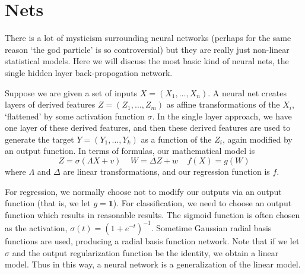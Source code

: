 \section{Nets}

There is a lot of mysticism surrounding neural networks (perhaps for the same reason `the god particle' is so controversial) but they are really just non-linear statistical models. Here we will discuss the most basic kind of neural nets, the single hidden layer back-propogation network.

Suppose we are given a set of inputs $X = (X_1, \dots, X_n)$. A neural net creates layers of derived features $Z = (Z_1, \dots, Z_m)$ as affine transformations of the $X_i$, `flattened' by some activation function $\sigma$. In the single layer approach, we have one layer of these derived features, and then these derived features are used to generate the target $Y = (Y_1, \dots, Y_k)$ as a function of the $Z_i$, again modified by an output function. In terms of formulas, our mathematical model is
%
\[ Z = \sigma(\Lambda X + v)\ \ \ \ \ W = \Delta Z + w\ \ \ \ \ f(X) = g(W) \]
%
where $\Lambda$ and $\Delta$ are linear transformations, and our regression function is $f$.

For regression, we normally choose not to modify our outputs via an output function (that is, we let $g = \mathbf{1}$). For classification, we need to choose an output function which results in reasonable results. The sigmoid function is often chosen as the activation, $\sigma(t) = (1 + e^{-t})^{-1}$. Sometime Gaussian radial basis functions are used, producing a radial basis function network. Note that if we let $\sigma$ and the output regularization function be the identity, we obtain a linear model. Thus in this way, a neural network is a generalization of the linear model.

